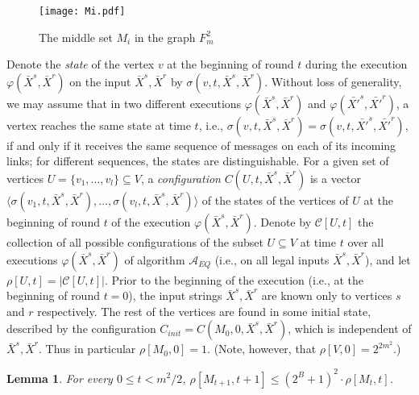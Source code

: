 \documentclass[11pt,letter]{article}
\def\cA{\mathcal{A}}
\def\cC{\mathcal{C}}
\def\INPUT{\bar{X}^s,\bar{X}^r}
\def\INPUTPrime{\bar{X'}^s,\bar{X'}^r}
\newtheorem{lemma}[theorem]{Lemma}
\begin{document}
\begin{figure} [htb]
\begin{center}

\centerline{\texttt{[image: Mi.pdf]}}

\caption[]{
\label{f:Ti}
\sf
The middle set $M_i$ in the graph $F^2_m$ }
\end{center}
\end{figure}

Denote the {\em state} of the vertex $v$ at the beginning of round $t$
during the execution $\varphi(\INPUT)$ on the input $\INPUT$ by
$\sigma(v,t,\INPUT)$. Without loss of generality, we may assume that in two different executions $\varphi(\INPUT)$ and
$\varphi(\INPUTPrime)$, a vertex reaches the same state at time
$t$, i.e., $\sigma(v,t,\INPUT) = \sigma(v,t,\INPUTPrime)$, 
if and only if  it receives the same sequence of messages on each of its incoming links; for different sequences, the states are distinguishable.
\newline\indent
For a given set of vertices $U = \{v_1, \dots, v_l\} \subseteq V$,
a {\em configuration} $C(U,t,\INPUT)$ is a vector
$\langle \sigma(v_1,t,\INPUT), \dots, \sigma(v_l, t, \INPUT) \rangle$
of the states of the vertices of $U$ at the beginning of
round $t$ of the execution $\varphi(\INPUT)$.
Denote by $\cC[U, t]$ the collection of all possible
configurations of the subset $U \subseteq V$ at time $t$ over all
executions $\varphi(\INPUT)$ of algorithm $\cA_{EQ}$ (i.e., on all legal
inputs $\INPUT$), and let $\rho[U,t] = |\cC[U,t]|$.
\newline\indent
Prior to the beginning of the execution (i.e., at the beginning of
round $t=0$), the input strings $\INPUT$ are known only to vertices 
$s$ and $r$ respectively. The rest of the vertices
are found in some initial state, described by the configuration
$C_{init} = C(M_0,0,\INPUT)$, which is independent of $\INPUT$.
Thus in particular $\rho[M_0,0] = 1$.
(Note, however, that $\rho[V,0] = 2^{2m^2}$.)


\begin{lemma}
\label{step}
For every $0 \le t < m^2/2$,
$\rho[M_{t+1},t+1] \le (2^B+1)^2 \cdot \rho[M_t,t]$.
\end{lemma}
\end{document}
